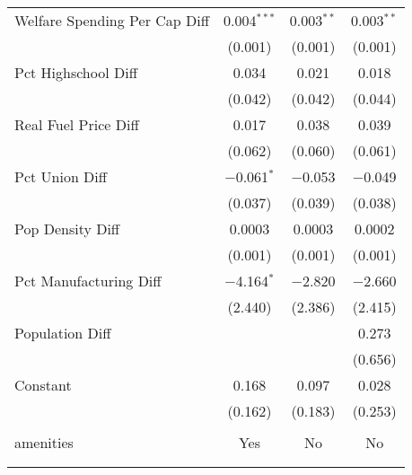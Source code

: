 \begin{table}[!htbp]
\begin{tabular}{@{\extracolsep{5pt}}lccc}
  Welfare Spending Per Cap Diff & 0.004$^{***}$ & 0.003$^{**}$ & 0.003$^{**}$ \\ 
  & (0.001) & (0.001) & (0.001) \\ 
  Pct Highschool Diff & 0.034 & 0.021 & 0.018 \\ 
  & (0.042) & (0.042) & (0.044) \\ 
  Real Fuel Price Diff & 0.017 & 0.038 & 0.039 \\ 
  & (0.062) & (0.060) & (0.061) \\ 
  Pct Union Diff & $-$0.061$^{*}$ & $-$0.053 & $-$0.049 \\ 
  & (0.037) & (0.039) & (0.038) \\ 
  Pop Density Diff & 0.0003 & 0.0003 & 0.0002 \\ 
  & (0.001) & (0.001) & (0.001) \\ 
  Pct Manufacturing Diff & $-$4.164$^{*}$ & $-$2.820 & $-$2.660 \\ 
  & (2.440) & (2.386) & (2.415) \\ 
  Population Diff &  &  & 0.273 \\ 
  &  &  & (0.656) \\ 
  Constant & 0.168 & 0.097 & 0.028 \\ 
  & (0.162) & (0.183) & (0.253) \\ 
 \hline \\[-1.8ex] 
amenities & Yes & No & No \\ 
\hline \\[-1.8ex] 
\hline 
\hline \\[-1.8ex] 
\end{tabular} 
\end{table} 
